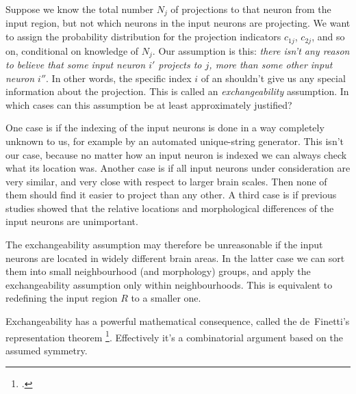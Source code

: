\documentclass[\ifafour a4paper,12pt,\else a5paper,10pt,\fi%
onecolumn,oneside,article,%
british%
]{memoir}
\theoremstyle{remark}
\theoremstyle{innote}
\newcommand*{\citep}{\footcites}
\renewcommand*{\|}[1][]{\nonscript\,#1\vert\nonscript\;\mathopen{}}
\begin{document}
Suppose we know the total number $N_{j}$ of projections to that neuron from
the input region, but not which neurons in the input neurons are
projecting. We want to assign the probability distribution for the
projection indicators $c_{1j}$, $c_{2j}$, and so on, conditional on
knowledge of $N_{j}$. Our assumption is this: \emph{there isn't any reason
  to believe that some input neuron $i'$ projects to $j$, more than some
  other input neuron $i''$}. In other words, the specific index $i$ of an
shouldn't give us any special information about the projection. This is
called an \emph{exchangeability} assumption.  In
which cases can this assumption be at least approximately justified?

One case is if the indexing of the input neurons is done in a way
completely unknown to us, for example by an automated unique-string
generator. This isn't our case, because no matter how an input neuron is
indexed we can always check what its location was. Another case is if all
input neurons under consideration are very similar, and very close with
respect to larger brain scales. Then none of them should find it easier to
project than any other. A third case is if previous studies showed that the
relative locations and morphological differences of the input neurons are
unimportant.

The exchangeability assumption may therefore be unreasonable if the input
neurons are located in widely different brain areas. In the latter case we
can sort them into small neighbourhood (and morphology) groups, and apply
the exchangeability assumption only within neighbourhoods. This is
equivalent to redefining the input region $R$ to a smaller one.

Exchangeability has a powerful mathematical consequence, called the
de~Finetti's representation theorem \citep{definetti1930,hewittetal1955}[a
more intuitive explanation is in][]{heathetal1976}[for an informative
review:][]{dawid2013}[the particular form used here is discussed
in][]{diaconis1977,diaconisetal1980}. Effectively it's a combinatorial
argument based on the assumed symmetry.
\end{document}
